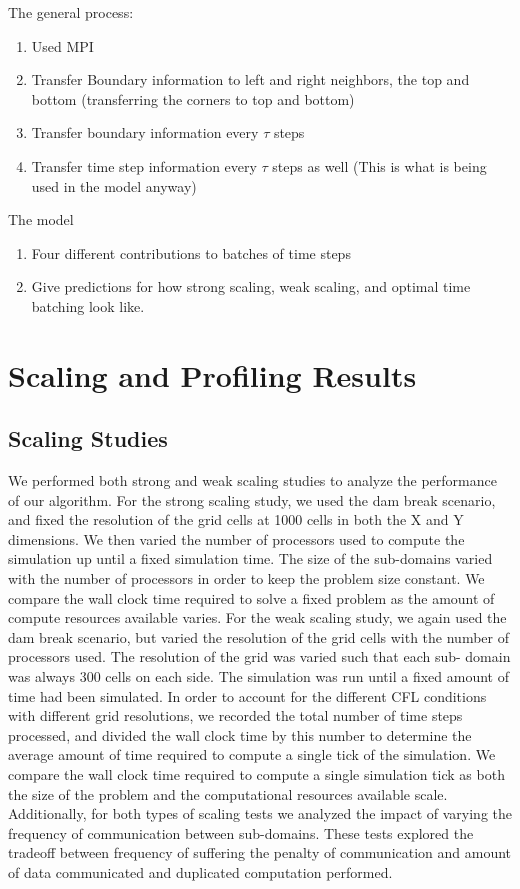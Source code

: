 \documentclass{article}
\begin{document}
The general process:
\begin{enumerate}
	\item Used MPI
	\item Transfer Boundary information to left and right neighbors, the top and bottom (transferring the corners to top and bottom)
	\item Transfer boundary information every $\tau$ steps
	\item Transfer time step information every $\tau$ steps as well (This is what is being used in the model anyway)
\end{enumerate}
The model
\begin{enumerate}
	\item Four different contributions to batches of time steps
	\item Give predictions for how strong scaling, weak scaling, and optimal time batching look like.
\end{enumerate}

\section{Scaling and Profiling Results}
\subsection{Scaling Studies}
We performed both strong and weak scaling studies to analyze the
performance of our algorithm. For the strong scaling study, we used the
dam break scenario, and fixed the resolution of the grid cells at 1000
cells in both the X and Y dimensions. We then varied the number of
processors used to compute the simulation up until a fixed simulation
time. The size of the sub-domains varied with the number of processors in
order to keep the problem size constant. We compare the wall clock time
required to solve a fixed problem as the amount of compute resources
available varies. For the weak scaling study, we again used the dam break
scenario, but varied the resolution of the grid cells with the number of
processors used. The resolution of the grid was varied such that each sub-
domain was always 300 cells on each side. The simulation was run until a
fixed amount of time had been simulated. In order to account for the
different CFL conditions with different grid resolutions, we recorded the
total number of time steps processed, and divided the wall clock time by
this number to determine the average amount of time required to compute a
single tick of the simulation. We compare the wall clock time required to
compute a single simulation tick as both the size of the problem and the
computational resources available scale. Additionally, for both types of
scaling tests we analyzed the impact of varying the frequency of
communication between sub-domains. These tests explored the tradeoff
between frequency of suffering the penalty of communication and amount
of data communicated and duplicated computation performed.
\end{document}
